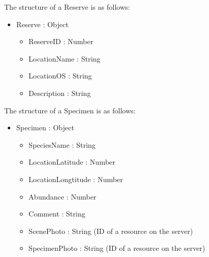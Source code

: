         The structure of a Reserve is as follows:
        \begin{itemize}
            \item Reserve : Object
            \begin{itemize}
                \item ReserveID : Number
                \item LocationName : String 
                \item LocationOS : String
                \item Description : String
            \end{itemize}
        \end{itemize}

        The structure of a Specimen is as follows:
        \begin{itemize}
            \item Specimen : Object
            \begin{itemize}
                \item SpeciesName : String
                \item LocationLatitude : Number
                \item LocationLongtitude : Number
                \item Abundance : Number
                \item Comment : String
                \item ScenePhoto : String (ID of a resource on the server)
                \item SpecimenPhoto : String (ID of a resource on the server)
            \end{itemize}
        \end{itemize}
        
